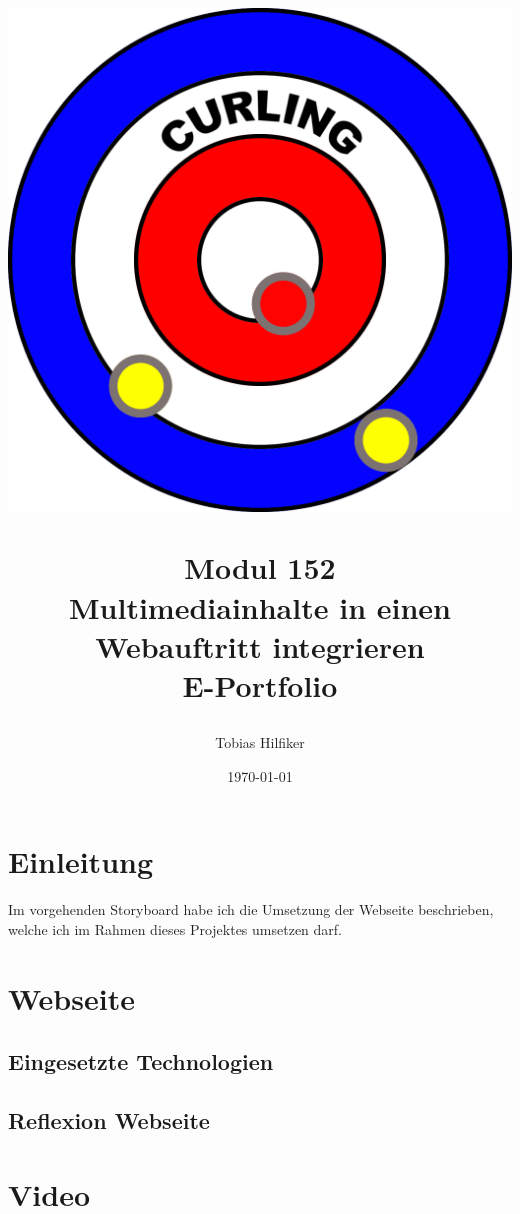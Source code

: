 \documentclass[11pt]{article}
\title{
    \includegraphics[width=\textwidth]{media/curling_logo}
    \begin{center}
        Modul 152 \\
        Multimediainhalte in einen Webauftritt integrieren\\
        E-Portfolio
    \end{center}}
\author{Tobias Hilfiker}
\date{\today}
\begin{document}
    \begin{titlingpage}
        \maketitle
    \end{titlingpage}
    \pagebreak

    \tableofcontents
    \pagebreak

    \section{Einleitung}
    Im vorgehenden Storyboard habe ich die Umsetzung der Webseite beschrieben, welche ich im Rahmen dieses Projektes umsetzen darf.

    \section{Webseite}

    \subsection{Eingesetzte Technologien}

    \subsection{Reflexion Webseite}

    \section{Video}

\end{document}
